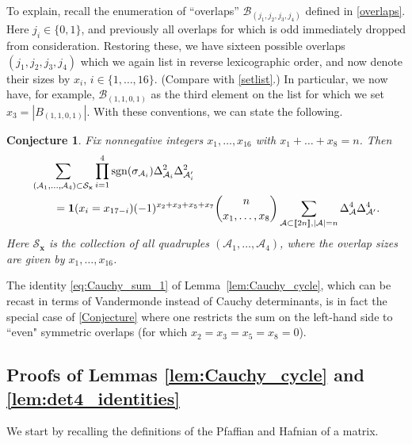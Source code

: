 \documentclass[pdftex]{sigma}
\numberwithin{equation}{section}
\newtheorem{Conjecture}[Theorem]{Conjecture}
\theoremstyle{definition}
\newcommand{\ind}{{\bf{1}}}
\newcommand{\cB}{\mathcal{B}}
\newcommand{\sgn}{\operatorname{sgn}}
\newcommand{\cA}{\mathcal{A}}
\newcommand{\lst}[1]{[\![#1 ]\!]}
\newcommand{\mbf}[1]{\mathbf{#1}}
\begin{document}
To explain, recall the enumeration of ``overlaps'' $\cB_{(j_1,j_2, j_3, j_4)}$ defined in \eqref{overlaps}. Here $j_i \in \{0,1\}$, and previously all overlaps for which  is odd immediately dropped from consideration. Restoring these, we have sixteen possible overlaps $(j_1, j_2, j_3, j_4)$ which we again
list in reverse lexicographic order, and now denote their sizes by $x_i$, $i \in \{1, \dots, 16\}$. (Compare with \eqref{setlist}.) In particular, we now have, for example,
$\cB_{(1,1,0,1)}$
as the third element on the list for which we set~${x_3 = |B_{(1,1,0,1)}| }$. With these conventions, we can state the following.


\begin{Conjecture}
Fix nonnegative integers $x_1, \dots, x_{16}$ with $x_1+\dots+x_8=n$.
Then
\begin{align}
 &\sum_{(\cA_1,\dots,\cA_4)\subset \mathcal{S}_{\mbf{x}}} \prod_{i=1}^4 \sgn(\sigma_{\cA_i}) \Delta_{\cA_i}^2 \Delta_{\cA_i'}^2 \nonumber\\
&\qquad = \ind(x_i=x_{17-i})
 (-1)^{x_2+x_3+x_5+x_7} { n \choose x_1, \dots , x_8 }
 \sum_{\cA \subset \lst{2n}, |\cA|=n}
 \Delta_{\cA}^4 \Delta_{\cA'}^4.
\label{Conjecture}
\end{align}
Here $\mathcal{S}_{\mbf{x}}$ is the collection of all quadruples $(\cA_1,\dots,\cA_4)$, where the overlap sizes are given by $x_1,\dots, x_{16}$.
\end{Conjecture}

The identity \eqref{eq:Cauchy_sum_1} of Lemma~\ref{lem:Cauchy_cycle}, which can be recast in terms of Vandermonde instead of Cauchy determinants, is in fact the special case of \eqref{Conjecture} where one restricts the sum on the left-hand side to ``even" symmetric overlaps (for which $x_2 = x_3 = x_5=x_8 = 0$).




\subsection[Proofs of Lemmas 6.1 and 6.2]{Proofs of Lemmas \ref{lem:Cauchy_cycle} and
\ref{lem:det4_identities}}

We start by recalling
 the definitions of the Pfaffian and Hafnian of a matrix.
\end{document}

